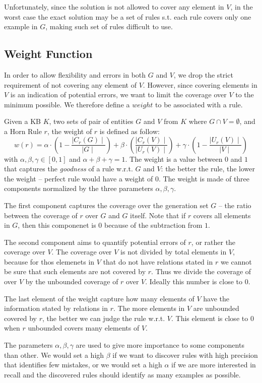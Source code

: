 Unfortunately, since the solution is not allowed to cover any element in $V$, in the worst case the exact solution may be a set of rules s.t. each rule covers only one example in $G$, making such set of rules difficult to use.

\subsection{Weight Function}
In order to allow flexibility and errors in both $G$ and $V$, we drop the strict requirement of not covering any element of $V$. However, since covering elements in $V$ is an indication of potential errors, we want to limit the coverage over $V$ to the minimum possible. We therefore define a $weight$ to be associated with a rule.


Given a KB $K$, two sets of pair of entities $G$ and $V$ from $K$ where $G \cap V = \emptyset$, and a Horn Rule $r$, the weight of $r$ is defined as follow:
\begin{equation*}
	w(r) = \alpha \cdot (1-\frac{\mid C_{r}(G)\mid}{\mid G \mid}) +\beta \cdot (\frac{\mid C_{r}(V) \mid}{\mid U_{r}(V)\mid})  +\gamma \cdot (1-\frac{\mid U_{r}(V)\mid}{\mid V \mid})
\end{equation*}
with $\alpha,\beta,\gamma \in [0,1]$ and $\alpha + \beta + \gamma = 1$. The weight is a value between $0$ and $1$ that captures the \emph{goodness} of a rule w.r.t. $G$ and $V$: the better the rule, the lower the weight -- perfect rule would have a weight of $0$. The weight is made of three components normalized by the three parameters $\alpha,\beta,\gamma$.
\begin{inparaenum}[\itshape(i)]
	\item The first component captures the coverage over the generation set $G$ -- the ratio between the coverage of $r$ over $G$ and $G$ itself. Note that if $r$ covers all elements in $G$, then this componenet is $0$ because of the subtraction from $1$.
	\item The second component aims to quantify potential errors of $r$, or rather the coverage over $V$. The coverage over $V$ is not divided by total elements in $V$, because 
	for thos elemenets in $V$ that do not have relations stated in $r$ we cannot be sure that such elements are not covered by $r$. Thus we divide the coverage of over $V$ by the unbounded coverage of $r$ over $V$. Ideally this number is close to $0$.
	\item The last element of the weight capture how many elements of $V$ have the information stated by relations in $r$. The more elements in $V$ are unbounded covered by $r$, the better we can judge the rule w.r.t. $V$. This element is close to $0$ when $r$ unbounded covers many elements of $V$. 
\end{inparaenum}
The parameters $\alpha,\beta,\gamma$ are used to give more importance to some components than other. We would set a high $\beta$ if we want to discover rules with high precision that identifies few mistakes, or we would set a high $\alpha$ if we are more interested in recall and the discovered rules should identify as many examples as possible.

